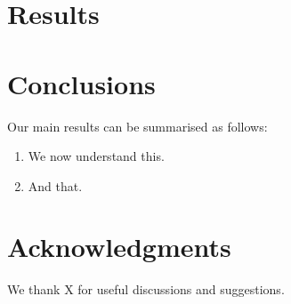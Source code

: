 \documentclass[useAMS,usenatbib]{mn2e}
\begin{document}
\section{Results}
\label{sec:results}





\section{Conclusions}
\label{sec:concl}

Our main results can be summarised as follows:

\begin{enumerate}

\item We now understand this.

\item And that.

\end{enumerate}




\section*{Acknowledgments}
 
We thank X for useful discussions and suggestions.











\label{lastpage}
\bsp
\end{document}
